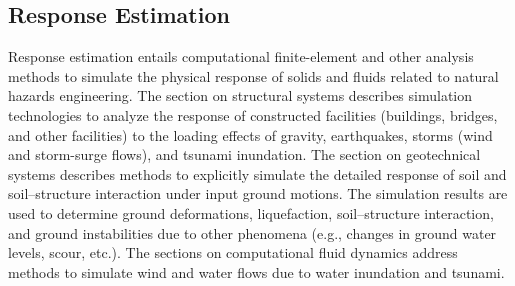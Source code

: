 
\begin{partbacktext}
\part{Response Estimation}

Response estimation entails computational finite-element and other analysis methods to simulate the physical response of solids and fluids related to natural hazards engineering. The section on structural systems describes simulation technologies to analyze the response of constructed facilities (buildings, bridges, and other facilities) to the loading effects of gravity, earthquakes, storms (wind and storm-surge flows), and tsunami inundation. The section on geotechnical systems describes methods to explicitly simulate the detailed response of soil and soil–structure interaction under input ground motions. The simulation results are used to determine ground deformations, liquefaction, soil–structure interaction, and ground instabilities due to other phenomena (e.g., changes in ground water levels, scour, etc.). The sections on computational fluid dynamics address methods to simulate wind and water flows due to water inundation and tsunami. 

\end{partbacktext}